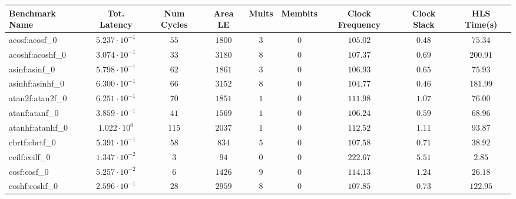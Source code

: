 \begin{tabular}{|l|c|c|c|c|c|c|c|c|}
\hline
Benchmark Name               & Tot. Latency            & Num Cycles & Area LE   & Mults   & Membits    & Clock Frequency & Clock Slack & HLS Time(s) \\
\hline
acosf:acosf\_0               & $ 5.237 \cdot 10^{-1} $ & $ 55     $ & $ 1800  $ & $ 3   $ & $ 0      $ & $ 105.02      $ & $ 0.48    $ & $ 75.34   $ \\
acoshf:acoshf\_0             & $ 3.074 \cdot 10^{-1} $ & $ 33     $ & $ 3180  $ & $ 8   $ & $ 0      $ & $ 107.37      $ & $ 0.69    $ & $ 200.91  $ \\
asinf:asinf\_0               & $ 5.798 \cdot 10^{-1} $ & $ 62     $ & $ 1861  $ & $ 3   $ & $ 0      $ & $ 106.93      $ & $ 0.65    $ & $ 75.93   $ \\
asinhf:asinhf\_0             & $ 6.300 \cdot 10^{-1} $ & $ 66     $ & $ 3152  $ & $ 8   $ & $ 0      $ & $ 104.77      $ & $ 0.46    $ & $ 181.99  $ \\
atan2f:atan2f\_0             & $ 6.251 \cdot 10^{-1} $ & $ 70     $ & $ 1851  $ & $ 1   $ & $ 0      $ & $ 111.98      $ & $ 1.07    $ & $ 76.00   $ \\
atanf:atanf\_0               & $ 3.859 \cdot 10^{-1} $ & $ 41     $ & $ 1569  $ & $ 1   $ & $ 0      $ & $ 106.24      $ & $ 0.59    $ & $ 68.96   $ \\
atanhf:atanhf\_0             & $ 1.022 \cdot 10^{0}  $ & $ 115    $ & $ 2037  $ & $ 1   $ & $ 0      $ & $ 112.52      $ & $ 1.11    $ & $ 93.87   $ \\
cbrtf:cbrtf\_0               & $ 5.391 \cdot 10^{-1} $ & $ 58     $ & $ 834   $ & $ 5   $ & $ 0      $ & $ 107.58      $ & $ 0.71    $ & $ 38.92   $ \\
ceilf:ceilf\_0               & $ 1.347 \cdot 10^{-2} $ & $ 3      $ & $ 94    $ & $ 0   $ & $ 0      $ & $ 222.67      $ & $ 5.51    $ & $ 2.85    $ \\
cosf:cosf\_0                 & $ 5.257 \cdot 10^{-2} $ & $ 6      $ & $ 1426  $ & $ 9   $ & $ 0      $ & $ 114.13      $ & $ 1.24    $ & $ 26.18   $ \\
coshf:coshf\_0               & $ 2.596 \cdot 10^{-1} $ & $ 28     $ & $ 2959  $ & $ 8   $ & $ 0      $ & $ 107.85      $ & $ 0.73    $ & $ 122.95  $ \\

\end{tabular}
